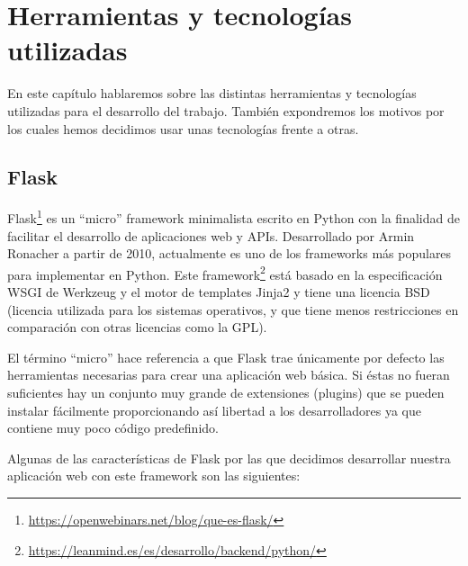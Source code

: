 \chapter{Herramientas y tecnologías utilizadas}
\label{cap:herramientas}


En este capítulo hablaremos sobre las distintas herramientas y tecnologías utilizadas para el desarrollo del trabajo. También expondremos los motivos por los cuales hemos decidimos usar unas tecnologías frente a otras.


\section{Flask}\label{sec:flask}


Flask\footnote{\href{https://openwebinars.net/blog/que-es-flask/}{https://openwebinars.net/blog/que-es-flask/}} es un ``micro'' framework minimalista escrito en Python con la finalidad de facilitar el desarrollo de aplicaciones web y APIs. Desarrollado por Armin Ronacher a partir de 2010, actualmente es uno de los frameworks más populares para implementar en Python. Este framework\footnote{\href{https://leanmind.es/es/desarrollo/backend/python/}{https://leanmind.es/es/desarrollo/backend/python/}} está basado en la especificación WSGI de Werkzeug y el motor de templates Jinja2 y tiene una licencia BSD (licencia utilizada para los sistemas operativos, y que tiene menos restricciones en comparación con otras licencias como la GPL). 

El término ``micro'' hace referencia a que Flask trae únicamente por defecto las herramientas necesarias para crear una aplicación web básica. Si éstas no fueran suficientes hay un conjunto muy grande de extensiones (plugins) que se pueden instalar fácilmente proporcionando así libertad a los desarrolladores ya que contiene muy poco código predefinido.

Algunas de las características de Flask por las que decidimos desarrollar nuestra aplicación web con este framework son las siguientes:

